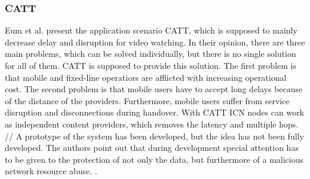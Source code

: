 \subsubsection{CATT}
 Eum et al. present the application scenario CATT, which is supposed to mainly decrease delay and disruption for video watching. In their opinion, there are three main problems, which can be solved individually, but there is no single solution for all of them. CATT is supposed to provide this solution. The first problem is that mobile and fixed-line operatiors are afflicted with increasing operational cost. The second problem is that mobile users have to accept long delays because of the distance of the providers. Furthermore, mobile users suffer from service disruption and disconnections during handover. With CATT ICN nodes can work as independent content providers, which removes the latency and multiple hops. //
A prototype of the system has been developed, but the idea has not been fully developed. The authors point out that during development special attention has to be given to the protection of not only the data, but furthermore of a malicious network resource abuse.  \cite{Eum:2015:DII:2803530.2803728}. 

